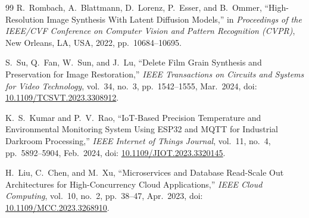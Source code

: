 \begin{thebibliography}{99}
R.~Rombach, A.~Blattmann, D.~Lorenz, P.~Esser, and B.~Ommer, ``High-Resolution Image Synthesis With Latent Diffusion Models,'' in \textit{Proceedings of the IEEE/CVF Conference on Computer Vision and Pattern Recognition (CVPR)}, New Orleans, LA, USA, 2022, pp.~10684--10695.

S.~Su, Q.~Fan, W.~Sun, and J.~Lu, ``Delete Film Grain Synthesis and Preservation for Image Restoration,'' \textit{IEEE Transactions on Circuits and Systems for Video Technology}, vol.~34, no.~3, pp.~1542--1555, Mar.~2024, doi: \href{https://doi.org/10.1109/TCSVT.2023.3308912}{10.1109/TCSVT.2023.3308912}.

K.~S.~Kumar and P.~V.~Rao, ``IoT-Based Precision Temperature and Environmental Monitoring System Using ESP32 and MQTT for Industrial Darkroom Processing,'' \textit{IEEE Internet of Things Journal}, vol.~11, no.~4, pp.~5892--5904, Feb.~2024, doi: \href{https://doi.org/10.1109/JIOT.2023.3320145}{10.1109/JIOT.2023.3320145}.

H.~Liu, C.~Chen, and M.~Xu, ``Microservices and Database Read-Scale Out Architectures for High-Concurrency Cloud Applications,'' \textit{IEEE Cloud Computing}, vol.~10, no.~2, pp.~38--47, Apr.~2023, doi: \href{https://doi.org/10.1109/MCC.2023.3268910}{10.1109/MCC.2023.3268910}.

\end{thebibliography}
